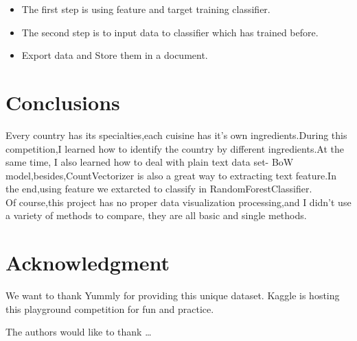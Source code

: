 \begin{itemize}
\begin{itemize}
\item
The first step is using feature and target training classifier.
\item
The second step is to input data to classifier which has trained before.
\item 
Export data and Store them in a document.
\end{itemize}


\end{itemize}







\section{Conclusions} \label{sec-conclusions}
Every country has its specialties,each cuisine has it's own ingredients.During this competition,I learned how to
identify the country by different ingredients.At the same time, I also learned how to deal with plain text data set-
BoW model,besides,CountVectorizer is also a great way to extracting text feature.In the end,using feature we extarcted to
classify in RandomForestClassifier.\\
Of course,this project has no proper data visualization processing,and I didn't use a variety of methods to compare,
they are all basic and single methods.
 
\section*{Acknowledgment}

We want to thank Yummly for providing this unique dataset. Kaggle is hosting this playground competition for fun and practice.

The authors would like to thank \ldots
